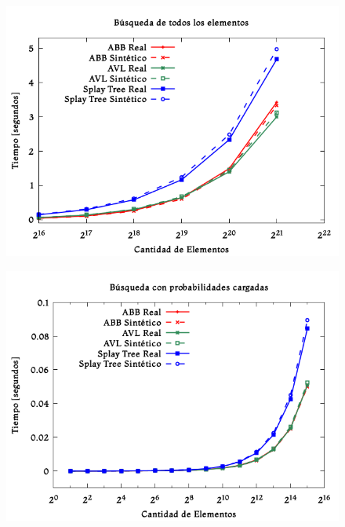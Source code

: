 \documentclass[12pt,letterpaper]{report}
\begin{document}
\begin{figure}[H]
\begin{center}
\includegraphics[scale=0.65]{random_busquedanormal.png}
\end{center}
\end{figure}

\begin{figure}[H]
\begin{center}
\includegraphics[scale=0.65]{random_busquedacargada.png}
\end{center}
\end{figure}
\end{document}
